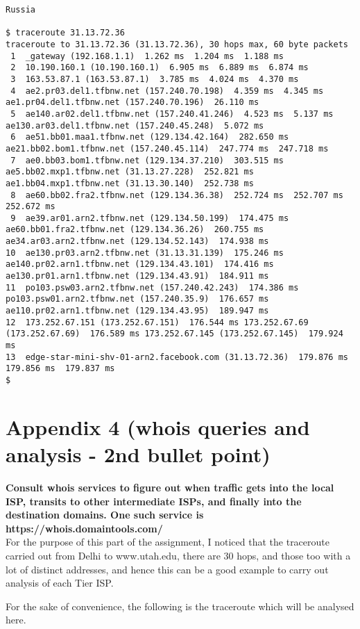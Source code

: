 \documentclass[a4paper]{article}
\newcommand{\nl}{\vspace{0.2cm}\\}
\begin{document}
\begin{lstlisting}
Russia

$ traceroute 31.13.72.36
traceroute to 31.13.72.36 (31.13.72.36), 30 hops max, 60 byte packets
 1  _gateway (192.168.1.1)  1.262 ms  1.204 ms  1.188 ms
 2  10.190.160.1 (10.190.160.1)  6.905 ms  6.889 ms  6.874 ms
 3  163.53.87.1 (163.53.87.1)  3.785 ms  4.024 ms  4.370 ms
 4  ae2.pr03.del1.tfbnw.net (157.240.70.198)  4.359 ms  4.345 ms ae1.pr04.del1.tfbnw.net (157.240.70.196)  26.110 ms
 5  ae140.ar02.del1.tfbnw.net (157.240.41.246)  4.523 ms  5.137 ms ae130.ar03.del1.tfbnw.net (157.240.45.248)  5.072 ms
 6  ae51.bb01.maa1.tfbnw.net (129.134.42.164)  282.650 ms ae21.bb02.bom1.tfbnw.net (157.240.45.114)  247.774 ms  247.718 ms
 7  ae0.bb03.bom1.tfbnw.net (129.134.37.210)  303.515 ms ae5.bb02.mxp1.tfbnw.net (31.13.27.228)  252.821 ms ae1.bb04.mxp1.tfbnw.net (31.13.30.140)  252.738 ms
 8  ae60.bb02.fra2.tfbnw.net (129.134.36.38)  252.724 ms  252.707 ms  252.672 ms
 9  ae39.ar01.arn2.tfbnw.net (129.134.50.199)  174.475 ms ae60.bb01.fra2.tfbnw.net (129.134.36.26)  260.755 ms ae34.ar03.arn2.tfbnw.net (129.134.52.143)  174.938 ms
10  ae130.pr03.arn2.tfbnw.net (31.13.31.139)  175.246 ms ae140.pr02.arn1.tfbnw.net (129.134.43.101)  174.416 ms ae130.pr01.arn1.tfbnw.net (129.134.43.91)  184.911 ms
11  po103.psw03.arn2.tfbnw.net (157.240.42.243)  174.386 ms po103.psw01.arn2.tfbnw.net (157.240.35.9)  176.657 ms ae110.pr02.arn1.tfbnw.net (129.134.43.95)  189.947 ms
12  173.252.67.151 (173.252.67.151)  176.544 ms 173.252.67.69 (173.252.67.69)  176.589 ms 173.252.67.145 (173.252.67.145)  179.924 ms
13  edge-star-mini-shv-01-arn2.facebook.com (31.13.72.36)  179.876 ms  179.856 ms  179.837 ms
$
\end{lstlisting}

\section{Appendix 4 (whois queries and analysis - 2nd bullet point)}

\textbf{Consult whois services to figure out when traffic gets into the local ISP, transits to other intermediate ISPs, and finally into the destination domains. One such service is https://whois.domaintools.com/}\nl
For the purpose of this part of the assignment, I noticed that the traceroute carried out from Delhi to www.utah.edu, there are 30 hops, and those too with a lot of distinct addresses, and hence this can be a good example to carry out analysis of each Tier ISP.

For the sake of convenience, the following is the traceroute which will be analysed here.
\end{document}
